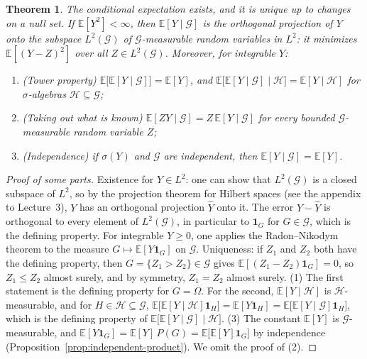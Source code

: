 \documentclass[11pt]{article}
\newcommand{\E}{\mathbb{E}}
\theoremstyle{definition}
\theoremstyle{plain}
\newtheorem{theorem}[definition]{Theorem}
\theoremstyle{remark}
\begin{document}
\begin{theorem}\label{thm:conditional-expectation-general}
    The conditional expectation exists, and it is unique up to changes on a null set. If $\E[Y^2] < \infty$, then $\E[Y \mid \mathcal{G}]$ is the orthogonal projection of $Y$ onto the subspace $L^2(\mathcal{G})$ of $\mathcal{G}$-measurable random variables in $L^2$: it minimizes $\E[(Y - Z)^2]$ over all $Z \in L^2(\mathcal{G})$. Moreover, for integrable $Y$:
    \begin{enumerate}
        \item (Tower property) $\E\big[\E[Y \mid \mathcal{G}]\big] = \E[Y]$, and $\E\big[\E[Y \mid \mathcal{G}] \mid \mathcal{H}\big] = \E[Y \mid \mathcal{H}]$ for $\sigma$-algebras $\mathcal{H} \subseteq \mathcal{G}$;
        \item (Taking out what is known) $\E[ZY \mid \mathcal{G}] = Z\,\E[Y \mid \mathcal{G}]$ for every bounded $\mathcal{G}$-measurable random variable $Z$;
        \item (Independence) if $\sigma(Y)$ and $\mathcal{G}$ are independent, then $\E[Y \mid \mathcal{G}] = \E[Y]$.
    \end{enumerate}
\end{theorem}

\begin{proof}[Proof of some parts]
    Existence for $Y \in L^2$: one can show that $L^2(\mathcal{G})$ is a closed subspace of $L^2$, so by the projection theorem for Hilbert spaces (see the appendix to Lecture~3), $Y$ has an orthogonal projection $\hat Y$ onto it. The error $Y - \hat Y$ is orthogonal to every element of $L^2(\mathcal{G})$, in particular to $\mathbf{1}_G$ for $G \in \mathcal{G}$, which is the defining property. For integrable $Y \geq 0$, one applies the Radon--Nikodym theorem to the measure $G \mapsto \E[Y\mathbf{1}_G]$ on $\mathcal{G}$. Uniqueness: if $Z_1$ and $Z_2$ both have the defining property, then $G = \{Z_1 > Z_2\} \in \mathcal{G}$ gives $\E[(Z_1 - Z_2)\mathbf{1}_G] = 0$, so $Z_1 \leq Z_2$ almost surely, and by symmetry, $Z_1 = Z_2$ almost surely. (1) The first statement is the defining property for $G = \Omega$. For the second, $\E[Y \mid \mathcal{H}]$ is $\mathcal{H}$-measurable, and for $H \in \mathcal{H} \subseteq \mathcal{G}$, $\E\big[\E[Y \mid \mathcal{H}]\mathbf{1}_H\big] = \E[Y\mathbf{1}_H] = \E\big[\E[Y \mid \mathcal{G}]\mathbf{1}_H\big]$, which is the defining property of $\E\big[\E[Y \mid \mathcal{G}] \mid \mathcal{H}\big]$. (3) The constant $\E[Y]$ is $\mathcal{G}$-measurable, and $\E[Y\mathbf{1}_G] = \E[Y]\,P(G) = \E\big[\E[Y]\mathbf{1}_G\big]$ by independence (Proposition~\ref{prop:independent-product}). We omit the proof of (2).
\end{proof}
\end{document}
